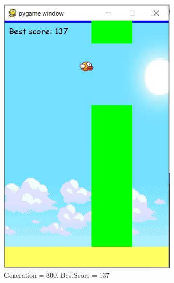 \documentclass[conference]{IEEEtran}
\begin{document}
\begin{figure}[H]
    \centering
    \begin{subfigure}[b]{0.2\textwidth}
        \includegraphics[width=\textwidth]{score137}
        \caption{Generation = 300, BestScore = 137}
        \label{fig:Input}
    \end{subfigure}
    ~ %
    \begin{subfigure}[b]{0.2\textwidth}

\end{subfigure}
\end{figure}
\end{document}
